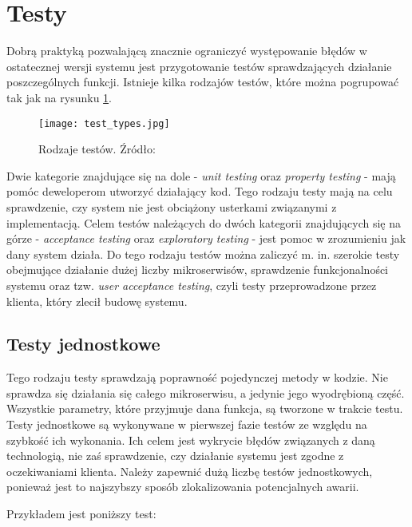 \newpage
\section{Testy}

Dobrą praktyką pozwalającą znacznie ograniczyć występowanie błędów w ostatecznej 
wersji systemu jest przygotowanie testów sprawdzających działanie poszczególnych 
funkcji. Istnieje kilka rodzajów testów, które można pogrupować tak jak na rysunku
\ref{fig:test-types}.

\begin{figure}[h]
    \centering
    \texttt{[image: test\_types.jpg]}
    \caption{Rodzaje testów. Źródło: \cite{newman2015}}
    \label{fig:test-types}
\end{figure}

Dwie kategorie znajdujące się na dole - \textit{unit testing} oraz \textit{property testing} - mają 
pomóc deweloperom utworzyć działający kod. Tego rodzaju testy mają na celu 
sprawdzenie, czy system nie jest obciążony usterkami związanymi z implementacją. 
Celem testów należących do dwóch kategorii znajdujących się na górze - \textit{acceptance 
testing} oraz \textit{exploratory testing} - jest pomoc w zrozumieniu jak dany system działa. 
Do tego rodzaju testów można zaliczyć m. in. szerokie testy obejmujące działanie dużej 
liczby mikroserwisów, sprawdzenie funkcjonalności systemu oraz tzw. \textit{user acceptance 
testing}, czyli testy przeprowadzone przez klienta, który zlecił budowę systemu.

\subsection{Testy jednostkowe}

Tego rodzaju testy sprawdzają poprawność pojedynczej metody w kodzie. Nie sprawdza się działania 
się całego mikroserwisu, a jedynie jego wyodrębioną część. Wszystkie parametry, które 
przyjmuje dana funkcja, są tworzone w trakcie testu. Testy jednostkowe są wykonywane 
w pierwszej fazie testów ze względu na szybkość ich wykonania. Ich celem jest wykrycie 
błędów związanych z daną technologią, nie zaś sprawdzenie, czy działanie systemu jest 
zgodne z oczekiwaniami klienta. Należy zapewnić dużą liczbę testów 
jednostkowych, ponieważ jest to najszybszy sposób zlokalizowania potencjalnych awarii.

Przykładem jest poniższy test:

